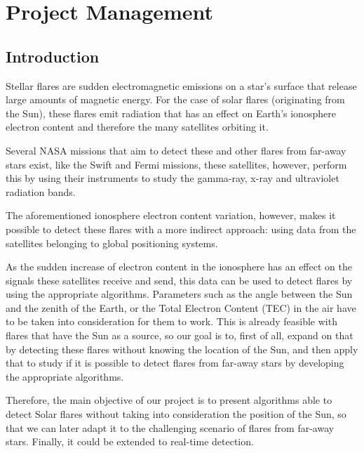 \chapter{Project Management}


\section{Introduction}

Stellar flares are sudden electromagnetic emissions on a star's surface that release large amounts of magnetic energy. For the case of solar flares (originating from the Sun), these flares emit radiation that has an effect on Earth’s ionosphere electron content and therefore the many satellites orbiting it. \cite{hernandez2012gnss}

Several NASA missions that aim to detect these and other flares from far-away stars exist, like the Swift and Fermi missions, these satellites, however, perform this by using their instruments to study the gamma-ray, x-ray and ultraviolet radiation bands. \cite{gehrels2013gamma}

The aforementioned ionosphere electron content variation, however, makes it possible to detect these flares with a more indirect approach: using data from the satellites belonging to global positioning systems.

As the sudden increase of electron content in the ionosphere has an effect on the signals these satellites receive and send, this data can be used to detect flares by using the appropriate algorithms. Parameters such as the angle between the Sun and the zenith of the Earth, or the Total Electron Content (TEC) in the air have to be taken into consideration for them to work. 
This is already feasible with flares that have the Sun as a source, so our goal is to, first of all, expand on that by detecting these flares without knowing the location of the Sun, and then apply that to study if it is possible to detect flares from far-away stars by developing the appropriate algorithms.

Therefore, the main objective of our project is to present algorithms able to detect Solar flares without taking into consideration the position of the Sun, so that we can later adapt it to the challenging scenario of flares from far-away stars. Finally, it could be extended to real-time detection.

